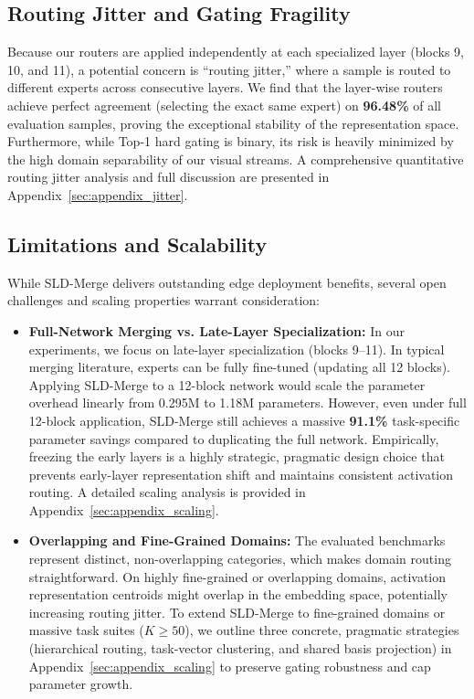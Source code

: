 \subsection{Routing Jitter and Gating Fragility}
Because our routers are applied independently at each specialized layer (blocks 9, 10, and 11), a potential concern is ``routing jitter,'' where a sample is routed to different experts across consecutive layers. We find that the layer-wise routers achieve perfect agreement (selecting the exact same expert) on \textbf{96.48\%} of all evaluation samples, proving the exceptional stability of the representation space. Furthermore, while Top-1 hard gating is binary, its risk is heavily minimized by the high domain separability of our visual streams. A comprehensive quantitative routing jitter analysis and full discussion are presented in Appendix~\ref{sec:appendix_jitter}.

\subsection{Limitations and Scalability}
While SLD-Merge delivers outstanding edge deployment benefits, several open challenges and scaling properties warrant consideration:
\begin{itemize}
    \item \textbf{Full-Network Merging vs. Late-Layer Specialization:} In our experiments, we focus on late-layer specialization (blocks 9--11). In typical merging literature, experts can be fully fine-tuned (updating all 12 blocks). Applying SLD-Merge to a 12-block network would scale the parameter overhead linearly from 0.295M to 1.18M parameters. However, even under full 12-block application, SLD-Merge still achieves a massive \textbf{91.1\%} task-specific parameter savings compared to duplicating the full network. Empirically, freezing the early layers is a highly strategic, pragmatic design choice that prevents early-layer representation shift and maintains consistent activation routing. A detailed scaling analysis is provided in Appendix~\ref{sec:appendix_scaling}.
    \item \textbf{Overlapping and Fine-Grained Domains:} The evaluated benchmarks represent distinct, non-overlapping categories, which makes domain routing straightforward. On highly fine-grained or overlapping domains, activation representation centroids might overlap in the embedding space, potentially increasing routing jitter. To extend SLD-Merge to fine-grained domains or massive task suites ($K \ge 50$), we outline three concrete, pragmatic strategies (hierarchical routing, task-vector clustering, and shared basis projection) in Appendix~\ref{sec:appendix_scaling} to preserve gating robustness and cap parameter growth.
\end{itemize}

